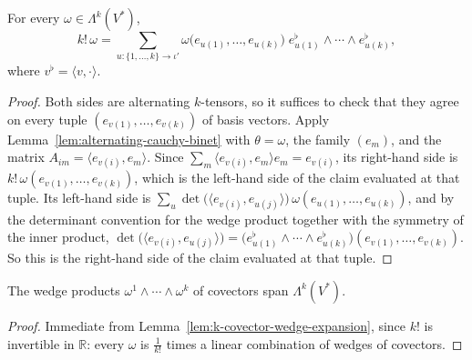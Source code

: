 \begin{lemma}
\label{lem:k-covector-wedge-expansion}
\leanok
{}
For every $\omega \in \Lambda^k(V^*)$,
\[
k!\,\omega = \sum_{u \colon \{1,\ldots,k\} \to \iota'} \omega\big(e_{u(1)}, \ldots, e_{u(k)}\big)\; e_{u(1)}^\flat \wedge \cdots \wedge e_{u(k)}^\flat,
\]
where $v^\flat = \langle v, \cdot \rangle$.
\end{lemma}
\begin{proof}
\leanok
{}
Both sides are alternating $k$-tensors, so it suffices to check that they agree on every tuple $(e_{v(1)}, \ldots, e_{v(k)})$ of basis vectors. Apply Lemma~\ref{lem:alternating-cauchy-binet} with $\theta = \omega$, the family $(e_m)$, and the matrix $A_{im} = \langle e_{v(i)}, e_m \rangle$. Since $\sum_m \langle e_{v(i)}, e_m\rangle e_m = e_{v(i)}$, its right-hand side is $k!\,\omega(e_{v(1)},\ldots,e_{v(k)})$, which is the left-hand side of the claim evaluated at that tuple. Its left-hand side is $\sum_{u} \det\big(\langle e_{v(i)}, e_{u(j)}\rangle\big)\,\omega(e_{u(1)},\ldots,e_{u(k)})$, and by the determinant convention for the wedge product together with the symmetry of the inner product, $\det\big(\langle e_{v(i)}, e_{u(j)}\rangle\big) = \big(e_{u(1)}^\flat \wedge \cdots \wedge e_{u(k)}^\flat\big)(e_{v(1)},\ldots,e_{v(k)})$. So this is the right-hand side of the claim evaluated at that tuple.
\end{proof}

\begin{lemma}
\label{lem:span-wedge-covectors}
\leanok
{}
The wedge products $\omega^1 \wedge \cdots \wedge \omega^k$ of covectors span $\Lambda^k(V^*)$.
\end{lemma}
\begin{proof}
\leanok
{}
Immediate from Lemma~\ref{lem:k-covector-wedge-expansion}, since $k!$ is invertible in $\mathbb{R}$: every $\omega$ is $\frac{1}{k!}$ times a linear combination of wedges of covectors.
\end{proof}

